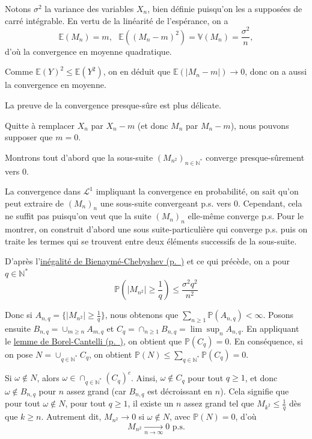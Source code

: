 \begin{preuve}  
Notons \(\sigma^2\) la variance des variables \(X_n\), bien définie
puisqu'on les a supposées de carré intégrable. En vertu de la linéarité
de l'espérance, on a
\[ \mathbb{E}(M_n) = m,\,\,\,\, \mathbb{E}((M_n-m)^2) = \mathbb{V}(M_n) = \frac{\sigma^2}{n},\]
d'où la convergence en moyenne quadratique.

Comme \(\mathbb{E}(Y)^2 \leq \mathbb{E}(Y^2)\), on en déduit que
\(\mathbb{E}(|M_n -m|)\to 0\), donc on a aussi la convergence en
moyenne.

La preuve de la convergence presque-sûre est plus délicate.

Quitte à remplacer \(X_n\) par \(X_n - m\) (et donc \(M_n\) par
\(M_n - m\)), nous pouvons supposer que \(m = 0\).

Montrons tout d'abord que la sous-suite
\((M_{n^2})_{n \in \mathbb{N}^\ast}\) converge presque-sûrement vers 0.

La convergence dans \(\mathcal{L}^1\) impliquant la convergence en
probabilité, on sait qu'on peut extraire de \((M_n)_n\) une sous-suite
convergeant p.s. vers 0. Cependant, cela ne suffit pas puisqu'on veut
que la suite \((M_n)_n\) elle-même converge p.s. Pour le montrer, on
construit d'abord une sous suite-particulière qui converge p.s. puis on
traite les termes qui se trouvent entre deux éléments successifs de la
sous-suite.

D'après l'\protect\hyperref[IV-inegbc]{inégalité de
Bienaymé-Chebyshev (p.~\pageref*{IV-inegbc})} et ce qui précède, on a
pour \(q\in \mathbb{N}^\ast\)
\[\mathbb{P}\left(|M_{n^2}|\geq \frac{1}{q}\right) \leq \frac{\sigma^2 q^2}{n^2}\]

Donc si \(A_{n,q} = \{|M_{n^2}|\geq \frac{1}{q}\}\), nous obtenons que
\(\sum_{n\geq 1} \mathbb{P}(A_{n,q}) < \infty\). Posons ensuite
\(B_{n,q} = \cup_{m\geq n} A_{m,q}\) et
\(C_q = \cap_{n \geq 1} B_{n,q} = \lim\sup_n A_{n,q}\). En appliquant le
\protect\hyperref[IV-BC]{lemme de Borel-Cantelli (p.~\pageref*{IV-BC})},
on obtient que \(\mathbb{P}(C_q) = 0\). En conséquence, si on pose
\(N = \cup_{q \in \mathbb{N}^\ast} C_q\), on obtient
\(\mathbb{P}(N) \leq \sum_{q\in\mathbb{N}^\ast} \mathbb{P}(C_q)= 0\).

Si \(\omega \notin N\), alors
\(\omega \in \cap_{q \in \mathbb{N}^\ast} (C_q)^c\). Ainsi,
\(\omega \notin C_q\) pour tout \(q \geq 1\), et donc
\(\omega \notin B_{n,q}\) pour \(n\) assez grand (car \(B_{n,q}\) est
décroissant en \(n\)). Cela signifie que pour tout \(\omega \notin N\),
pour tout \(q \geq 1\), il existe un \(n\) assez grand tel que
\(M_{k^2} \leq \frac{1}{q}\) dès que \(k \geq n\). Autrement dit,
\(M_{n^2} \to 0\) si \(\omega \notin N\), avec \(\mathbb{P}(N) = 0\),
d'où \[ M_{n^2} \xrightarrow[n \to \infty]{} 0 \text{ p.s.}\]


\end{preuve}
